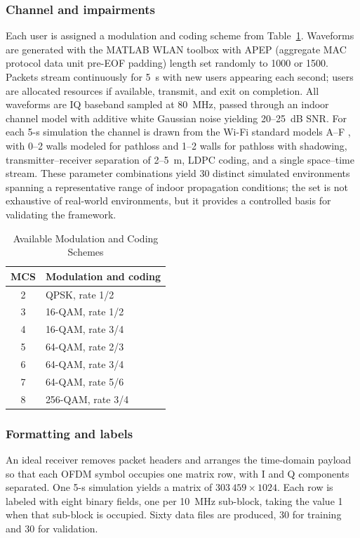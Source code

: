 \documentclass[lettersize,journal]{IEEEtran}
\begin{document}
\subsubsection{Channel and impairments}
Each user is assigned a modulation and coding scheme from
Table~\ref{tab:mcs}. Waveforms are generated with the MATLAB WLAN
toolbox with APEP (aggregate MAC protocol data unit pre-EOF padding) length set
randomly to 1000 or 1500. Packets stream
continuously for 5~s with new users appearing each second; users are
allocated resources if available, transmit, and exit on completion. All
waveforms are IQ baseband sampled at 80~MHz, passed through an indoor
channel model with additive white Gaussian noise yielding 20--25~dB SNR.
For each 5-s simulation the channel is drawn from the Wi-Fi standard
models A--F \cite{Liu2014}, with 0--2 walls modeled for pathloss and
1--2 walls for pathloss with shadowing, transmitter--receiver separation
of 2--5~m, LDPC coding, and a single space--time stream. These parameter
combinations yield 30 distinct simulated environments spanning a
representative range of indoor propagation conditions; the set is not
exhaustive of real-world environments, but it provides a controlled basis for
validating the framework.

\begin{table}[t]
\centering
\caption{Available Modulation and Coding Schemes}
\label{tab:mcs}
\renewcommand{\arraystretch}{1.15}
\begin{tabular}{@{}cl@{}}
\toprule
\textbf{MCS} & \textbf{Modulation and coding} \\
\midrule
2 & QPSK, rate 1/2 \\
3 & 16-QAM, rate 1/2 \\
4 & 16-QAM, rate 3/4 \\
5 & 64-QAM, rate 2/3 \\
6 & 64-QAM, rate 3/4 \\
7 & 64-QAM, rate 5/6 \\
8 & 256-QAM, rate 3/4 \\
\bottomrule
\end{tabular}
\end{table}

\subsubsection{Formatting and labels}
An ideal receiver removes packet headers and arranges the time-domain
payload so that each OFDM symbol occupies one matrix row, with I and Q
components separated. One 5-s simulation yields a matrix of
$303\,459 \times 1024$. Each row is labeled with eight binary fields, one
per 10~MHz sub-block, taking the value 1 when that sub-block is occupied.
Sixty data files are produced, 30 for training and 30 for validation.
\end{document}
